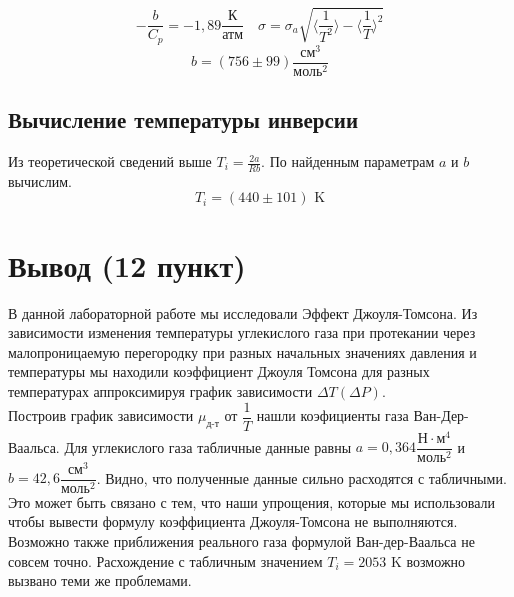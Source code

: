 \documentclass[a4paper,12pt]{article}
\begin{document}
\[ -\dfrac{b}{C_{p}} = -1,89 \frac{\text{К}}{\text{атм}} \quad \sigma = \sigma_{a} \sqrt{\langle \dfrac{1}{T^2} \rangle - \langle \dfrac{1}{T} \rangle^2} \]
\[ {b} = (756 \pm 99) \dfrac{\text{см}^3}{\text{моль}^2}  \]

\subsection*{Вычисление температуры инверсии}
Из теоретической сведений выше $T_i = \frac{2a}{Rb}$. По найденным параметрам $a$ и $b$ вычислим. 
\[ T_i = (440 \pm 101) \text{ K}\]

\section{Вывод (12 пункт)} 

В данной лабораторной работе мы исследовали Эффект Джоуля-Томсона. Из зависимости изменения температуры углекислого газа при протекании через малопроницаемую перегородку 
при разных начальных значениях давления и температуры мы находили коэффициент Джоуля Томсона для разных температурах аппроксимируя график  зависимости $\Delta T(\Delta P)$.
\\ Построив график зависимости $\mu_\text{д-т}$ от $\dfrac{1}{T}$ нашли коэфициенты газа Ван-Дер-Ваальса. Для углекислого газа табличные данные равны $a = 0,364 \dfrac{Н \cdot м^4}{\text{моль}^2}$ и 
${b} = 42,6 \dfrac{\text{см}^3}{\text{моль}^2}$. Видно, что полученные данные сильно расходятся с табличными. Это может быть связано с тем, что наши упрощения, которые мы использовали чтобы вывести формулу коэффициента Джоуля-Томсона не выполняются. 
Возможно также приближения реального газа формулой Ван-дер-Ваальса не совсем точно. Расхождение с табличным значением $T_i = 2053 \text{ K}$ возможно вызвано теми же проблемами. 
\end{document}
